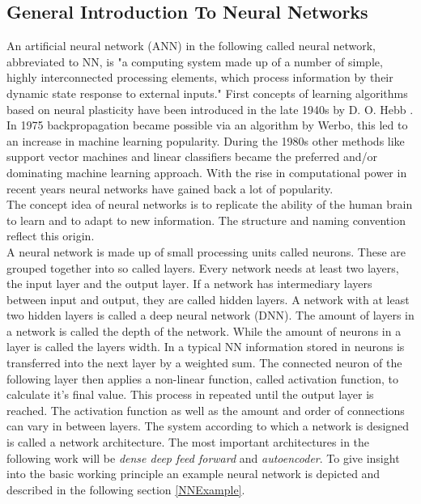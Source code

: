 		\subsection{General Introduction To Neural Networks}
		An artificial neural network (ANN) in the following called neural network, abbreviated to NN, is "a computing system made up of a number of simple, highly interconnected processing elements, which process information by their dynamic state response to external inputs." \cite{NNPrimer} %
		First concepts of learning algorithms based on neural plasticity have been introduced in the late 1940s by D. O. Hebb . In 1975 backpropagation became possible via an algorithm by Werbo, this led to an increase in machine learning popularity. During the 1980s other methods like support vector machines and linear classifiers became the preferred and/or dominating machine learning approach. With the rise in computational power in recent years neural networks have gained back a lot of popularity.\\
		The concept idea of neural networks is to replicate the ability of the human brain to learn and to adapt to new information. The structure and naming convention reflect this origin.\\
		A neural network is made up of small processing units called neurons. These are grouped together into so called layers. Every network needs at least two layers, the input layer and the output layer. If a network has intermediary layers between input and output, they are called hidden layers. A network with at least two hidden layers is called a deep neural network (DNN). The amount of layers in a network is called the depth of the network. While the amount of neurons in a layer is called the layers width.
		In a typical NN information stored in neurons is transferred into the next layer by a weighted sum. The connected neuron of the following layer then applies a non-linear function, called activation function, to calculate it's final value. This process in repeated until the output layer is reached. The activation function as well as the amount and order of connections can vary in between layers. The system according to which a network is designed is called a network architecture. The most important architectures in the following work will be \textit{dense deep feed forward} and \textit{autoencoder}. To give insight into the basic working principle an example neural network is depicted and described in the following section \ref{NNExample}.\\
